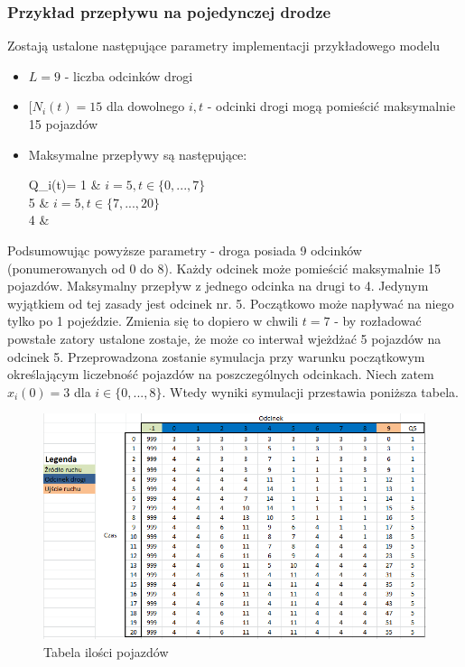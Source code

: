 \documentclass[12pt]{book}
\theoremstyle{plain}
\begin{document}
\subsubsection*{Przykład przepływu na pojedynczej drodze}
Zostają ustalone następujące parametry implementacji przykładowego modelu
\begin{itemize}
	\item $L=9$ - liczba odcinków drogi
	\item $[N_i(t)=15$ dla dowolnego $i,t$ - odcinki drogi mogą pomieścić maksymalnie 15 pojazdów
	\item Maksymalne przepływy są następujące: \begin{numcases}{Q_i(t)=}
	1 &  $i=5, t\in \{0,...,7\}$ \\ 
	5 &  $i=5, t\in \{7,...,20\}$ \\ 	
	4 & 
	\end{numcases}
\end{itemize}
Podsumowując powyższe parametry - droga posiada 9 odcinków (ponumerowanych od 0 do 8). Każdy odcinek może pomieścić maksymalnie 15 pojazdów. Maksymalny przepływ z jednego odcinka na drugi to 4. Jedynym wyjątkiem od tej zasady jest odcinek nr. 5. Początkowo może napływać na niego tylko po 1 pojeździe. Zmienia się to dopiero w chwili $t=7$ - by rozładować powstałe zatory ustalone zostaje, że może co interwał wjeżdżać 5 pojazdów na odcinek 5. Przeprowadzona zostanie symulacja przy warunku początkowym określającym liczebność pojazdów na poszczególnych odcinkach. Niech zatem $x_i(0)=3$ dla $i \in \{0,...,8\}$. Wtedy wyniki symulacji przestawia poniższa tabela.
\begin{figure}[H]
	\centering
	\includegraphics[width=14cm]{images/ctm_przyklad}
	\caption{Tabela ilości pojazdów}
	\label{fig:ctm_przyklad}\end{figure}
\end{document}
